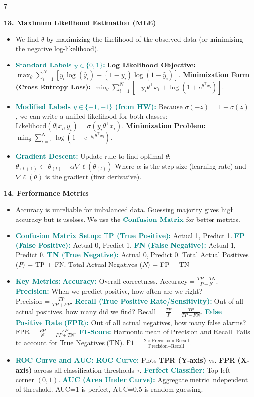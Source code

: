 \documentclass{article}
\newcommand{\hlhighlight}[1]{\par\vspace{1.5pt}\noindent\colorbox{yellow!50}{\parbox{\dimexpr\columnwidth-2\fboxsep\relax}{\textbf{#1}}}\par\vspace{0.5pt}}
\newcommand{\sectitle}[1]{\par\textbf{\color{blue!70!black}{#1}}\par}
\newcommand{\concept}[1]{\textcolor{teal}{\textbf{#1}}}
\newcommand{\lbl}[1]{\textcolor{green!60!black}{\textbf{#1}}}
\begin{document}
\begin{multicols}{7}
\hlhighlight{13. Maximum Likelihood Estimation (MLE)}
\sectitle{Objective Functions}
\begin{itemize}
    \item We find $\theta$ by maximizing the likelihood of the observed data (or minimizing the negative log-likelihood).
    \item \concept{Standard Labels $y \in \{0, 1\}$:} \lbl{Log-Likelihood Objective:} $\max_\theta \sum_{i=1}^{N} \left[ y_i \log(\hat{y}_i) + (1-y_i)\log(1-\hat{y}_i) \right]$. \lbl{Minimization Form (Cross-Entropy Loss):} $\min_\theta \sum_{i=1}^{N} \left[ -y_i \theta^\top x_i + \log(1 + e^{\theta^\top x_i}) \right]$.
    \item \concept{Modified Labels $y \in \{-1, +1\}$ (from HW):} Because $\sigma(-z) = 1-\sigma(z)$, we can write a unified likelihood for both classes: $\text{Likelihood}(\theta | x_i, y_i) = \sigma(y_i \theta^\top x_i)$. \lbl{Minimization Problem:} $\min_\theta \sum_{i=1}^{N} \log(1 + e^{-y_i \theta^\top x_i})$.
    \item \concept{Gradient Descent:} Update rule to find optimal $\theta$: $\theta_{(t+1)} \leftarrow \theta_{(t)} - \alpha \nabla \ell(\theta_{(t)})$ Where $\alpha$ is the step size (learning rate) and $\nabla \ell(\theta)$ is the gradient (first derivative).
\end{itemize}

\hlhighlight{14. Performance Metrics}
\sectitle{Evaluating Classifiers}
\begin{itemize}
    \item Accuracy is unreliable for imbalanced data. Guessing majority gives high accuracy but is useless. We use the \concept{Confusion Matrix} for better metrics.
    \item \concept{Confusion Matrix Setup:} \concept{TP (True Positive):} Actual 1, Predict 1. \concept{FP (False Positive):} Actual 0, Predict 1. \concept{FN (False Negative):} Actual 1, Predict 0. \concept{TN (True Negative):} Actual 0, Predict 0. Total Actual Positives ($P$) = TP + FN. Total Actual Negatives ($N$) = FP + TN.
    \item \concept{Key Metrics:} \concept{Accuracy:} Overall correctness. $\text{Accuracy} = \frac{TP + TN}{P + N}$. \concept{Precision:} When we predict positive, how often are we right? $\text{Precision} = \frac{TP}{TP + FP}$. \concept{Recall (True Positive Rate/Sensitivity):} Out of all actual positives, how many did we find? $\text{Recall} = \frac{TP}{P} = \frac{TP}{TP + FN}$. \concept{False Positive Rate (FPR):} Out of all actual negatives, how many false alarms? $\text{FPR} = \frac{FP}{N} = \frac{FP}{FP + TN}$. \concept{F1-Score:} Harmonic mean of Precision and Recall. Fails to account for True Negatives (TN). $\text{F1} = \frac{2 \times \text{Precision} \times \text{Recall}}{\text{Precision} + \text{Recall}}$.
    \item \concept{ROC Curve and AUC:} \concept{ROC Curve:} Plots \lbl{TPR (Y-axis)} vs. \lbl{FPR (X-axis)} across all classification thresholds $\tau$. \concept{Perfect Classifier:} Top left corner $(0,1)$. \concept{AUC (Area Under Curve):} Aggregate metric independent of threshold. AUC=1 is perfect, AUC=0.5 is random guessing.
\end{itemize}


\end{multicols}
\end{document}
